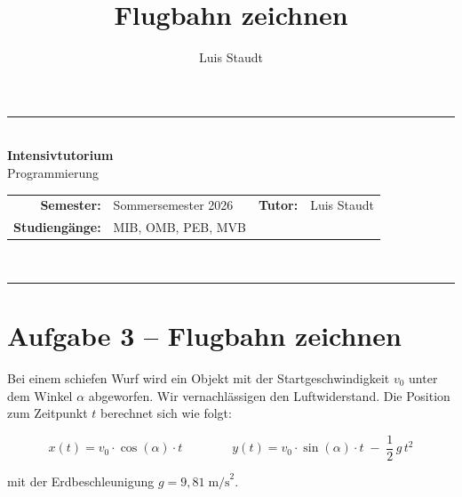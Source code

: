 \documentclass[
	fontsize=12pt,          %
	paper=a4,               %
	numbers=noenddot,       %
	listof=totoc,           %
	listof=entryprefix,     %
	listof=nochaptergap,    %
	bibliography=totoc,     %
	parskip=half            %
	openany                 %
]{scrbook}
\title{\Huge\textbf{Flugbahn zeichnen}}
\author{Luis Staudt}
\date{}
\begin{document}
\begin{center}
	\rule{\textwidth}{0.8pt}\\[0.6em]
	{\LARGE\bfseries Intensivtutorium}\\[0.3em]
	{\large Programmierung}\\[0.6em]
	\begin{tabular}{r l @{\hspace{2cm}} r l}
		\textbf{Semester:}      & Sommersemester 2026                    & \textbf{Tutor:}         & Luis Staudt \\
		\textbf{Studiengänge:}  & MIB, OMB, PEB, MVB         & & \\
	\end{tabular}\\[0.6em]
	\rule{\textwidth}{0.8pt}
\end{center}
\vspace{1em}

\pagestyle{fancy}
\fancyhf{}
\cfoot{\thepage}
\renewcommand{\headrulewidth}{0.4pt}



\section*{Aufgabe 3 -- Flugbahn zeichnen}

Bei einem schiefen Wurf wird ein Objekt mit der Startgeschwindigkeit $v_0$ unter dem Winkel $\alpha$ abgeworfen. Wir vernachlässigen den Luftwiderstand. Die Position zum Zeitpunkt $t$ berechnet sich wie folgt:

\[
	x(t) = v_0 \cdot \cos(\alpha) \cdot t
	\qquad\qquad
	y(t) = v_0 \cdot \sin(\alpha) \cdot t \;-\; \frac{1}{2}\,g\,t^2
\]

mit der Erdbeschleunigung $g = 9{,}81\;\text{m/s}^2$.
\end{document}
